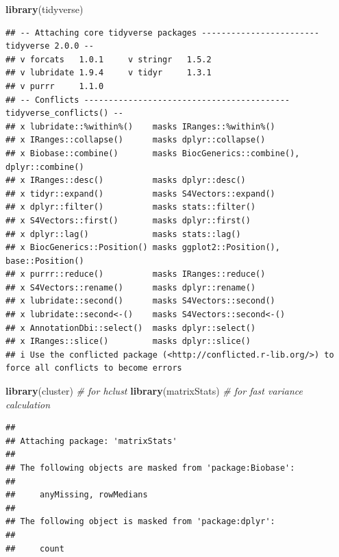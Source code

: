\documentclass[
]{article}
\newenvironment{Shaded}{\begin{snugshade}}{\end{snugshade}}
\newcommand{\CommentTok}[1]{\textcolor[rgb]{0.56,0.35,0.01}{\textit{#1}}}
\newcommand{\FunctionTok}[1]{\textcolor[rgb]{0.13,0.29,0.53}{\textbf{#1}}}
\newcommand{\NormalTok}[1]{#1}
\begin{document}
\begin{Shaded}
\begin{Highlighting}[]
\FunctionTok{library}\NormalTok{(tidyverse)}
\end{Highlighting}
\end{Shaded}

\begin{verbatim}
## -- Attaching core tidyverse packages ------------------------ tidyverse 2.0.0 --
## v forcats   1.0.1     v stringr   1.5.2
## v lubridate 1.9.4     v tidyr     1.3.1
## v purrr     1.1.0     
## -- Conflicts ------------------------------------------ tidyverse_conflicts() --
## x lubridate::%within%()    masks IRanges::%within%()
## x IRanges::collapse()      masks dplyr::collapse()
## x Biobase::combine()       masks BiocGenerics::combine(), dplyr::combine()
## x IRanges::desc()          masks dplyr::desc()
## x tidyr::expand()          masks S4Vectors::expand()
## x dplyr::filter()          masks stats::filter()
## x S4Vectors::first()       masks dplyr::first()
## x dplyr::lag()             masks stats::lag()
## x BiocGenerics::Position() masks ggplot2::Position(), base::Position()
## x purrr::reduce()          masks IRanges::reduce()
## x S4Vectors::rename()      masks dplyr::rename()
## x lubridate::second()      masks S4Vectors::second()
## x lubridate::second<-()    masks S4Vectors::second<-()
## x AnnotationDbi::select()  masks dplyr::select()
## x IRanges::slice()         masks dplyr::slice()
## i Use the conflicted package (<http://conflicted.r-lib.org/>) to force all conflicts to become errors
\end{verbatim}

\begin{Shaded}
\begin{Highlighting}[]
\FunctionTok{library}\NormalTok{(cluster) }\CommentTok{\# for hclust}
\FunctionTok{library}\NormalTok{(matrixStats) }\CommentTok{\# for fast variance calculation}
\end{Highlighting}
\end{Shaded}

\begin{verbatim}
## 
## Attaching package: 'matrixStats'
## 
## The following objects are masked from 'package:Biobase':
## 
##     anyMissing, rowMedians
## 
## The following object is masked from 'package:dplyr':
## 
##     count
\end{verbatim}
\end{document}
